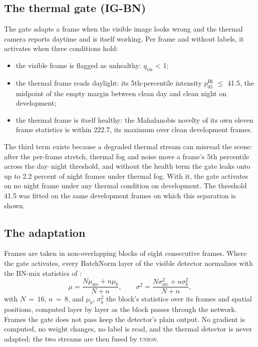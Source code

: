 \documentclass[10pt]{article}
\begin{document}
\subsection{The thermal gate (IG-BN)}\label{sec:4.2}
The gate adapts a frame when the visible image looks wrong and the thermal camera reports daytime and is itself working. Per frame and without labels, it activates when three conditions hold:
\begin{itemize}
\item the visible frame is flagged as unhealthy: $q_{\mathrm{vis}}$ < 1;
\item the thermal frame reads daylight: its 5th-percentile intensity $p_{05}^{\mathrm{IR}}$ $\leq$ 41.5, the midpoint of the empty margin between clean day and clean night on development;
\item the thermal frame is itself healthy: the Mahalanobis novelty of its own eleven frame statistics is within 222.7, its maximum over clean development frames.
\end{itemize}

The third term exists because a degraded thermal stream can misread the scene: after the per-frame stretch, thermal fog and noise move a frame's 5th percentile across the day--night threshold, and without the health term the gate leaks onto up to 2.2 percent of night frames under thermal fog. With it, the gate activates on no night frame under any thermal condition on development. The threshold 41.5 was fitted on the same development frames on which this separation is shown.

\subsection{The adaptation}\label{sec:4.3}
Frames are taken in non-overlapping blocks of eight consecutive frames. Where the gate activates, every BatchNorm layer of the visible detector normalizes with the BN-mix statistics of \citet{schneider2020improving}:
\begin{equation*}\mu = \frac{N\mu_{\mathrm{src}} + n\mu_b}{N+n},\qquad \sigma^2 = \frac{N\sigma^2_{\mathrm{src}} + n\sigma^2_b}{N+n},\end{equation*}
with $N\,{=}\,16$, $n\,{=}\,8$, and $\mu_b$, $\sigma^2_b$ the block's statistics over its frames and spatial positions, computed layer by layer as the block passes through the network. Frames the gate does not pass keep the detector's plain output. No gradient is computed, no weight changes, no label is read, and the thermal detector is never adapted; the two streams are then fused by \textsc{union}.
\end{document}
